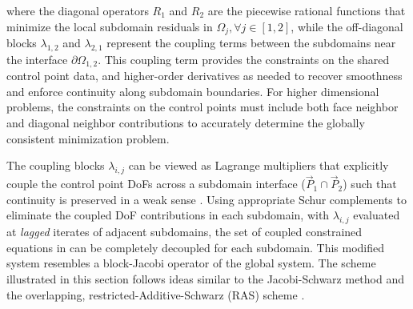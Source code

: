 
where the diagonal operators $R_{1}$ and $R_{2}$ are the piecewise rational functions that minimize the local subdomain residuals in $\Omega_j, \forall j \in [1,2]$, while the off-diagonal blocks $\lambda_{1,2}$ and $\lambda_{2,1}$ represent the coupling terms between the subdomains near the interface $\partial \Omega_{1,2}$. This coupling term provides the constraints on the shared control point data, and higher-order derivatives as needed to recover smoothness and enforce continuity along subdomain boundaries. For higher dimensional problems, the constraints on the control points must include both face neighbor and diagonal neighbor contributions to accurately determine the globally consistent minimization problem. 

The coupling blocks $\lambda_{i,j}$ can be viewed as Lagrange multipliers that explicitly couple the control point DoFs across a subdomain interface ($\vec{P}_{1} \cap \vec{P}_{2}$) such that continuity is preserved in a weak sense \cite{nurbs-book}. Using appropriate Schur complements to eliminate the coupled DoF contributions in each subdomain, with $\lambda_{i,j}$ evaluated at \textit{lagged} iterates of adjacent subdomains, the set of coupled constrained equations in  can be completely decoupled for each subdomain. This modified system resembles a block-Jacobi operator of the global system. The scheme illustrated in this section follows ideas similar to the Jacobi-Schwarz method \cite{gander-rasm} and the overlapping,  restricted-Additive-Schwarz (RAS) scheme \cite{orasm-as-ms-2007}.



